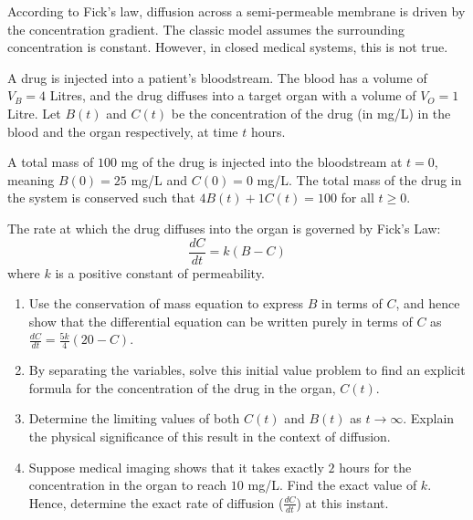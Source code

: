 \begin{problem}
According to Fick's law, diffusion across a semi-permeable membrane is driven by the concentration gradient. The classic model assumes the surrounding concentration is constant. However, in closed medical systems, this is not true. 

A drug is injected into a patient's bloodstream. The blood has a volume of $V_B = 4$ Litres, and the drug diffuses into a target organ with a volume of $V_O = 1$ Litre. Let $B(t)$ and $C(t)$ be the concentration of the drug (in mg/L) in the blood and the organ respectively, at time $t$ hours.

A total mass of $100$ mg of the drug is injected into the bloodstream at $t=0$, meaning $B(0) = 25$ mg/L and $C(0) = 0$ mg/L. The total mass of the drug in the system is conserved such that $4B(t) + 1C(t) = 100$ for all $t \ge 0$. 

The rate at which the drug diffuses into the organ is governed by Fick's Law:
\[ \frac{dC}{dt} = k(B - C) \]
where $k$ is a positive constant of permeability.

\begin{enumerate}
    \item[\textbf{i}] Use the conservation of mass equation to express $B$ in terms of $C$, and hence show that the differential equation can be written purely in terms of $C$ as $\frac{dC}{dt} = \frac{5k}{4}(20 - C)$.
    \item[\textbf{ii}] By separating the variables, solve this initial value problem to find an explicit formula for the concentration of the drug in the organ, $C(t)$.
    \item[\textbf{iii}] Determine the limiting values of both $C(t)$ and $B(t)$ as $t \to \infty$. Explain the physical significance of this result in the context of diffusion.
    \item[\textbf{iv}] Suppose medical imaging shows that it takes exactly $2$ hours for the concentration in the organ to reach $10$ mg/L. Find the exact value of $k$. Hence, determine the exact rate of diffusion ($\frac{dC}{dt}$) at this instant.
\end{enumerate}
\end{problem}

